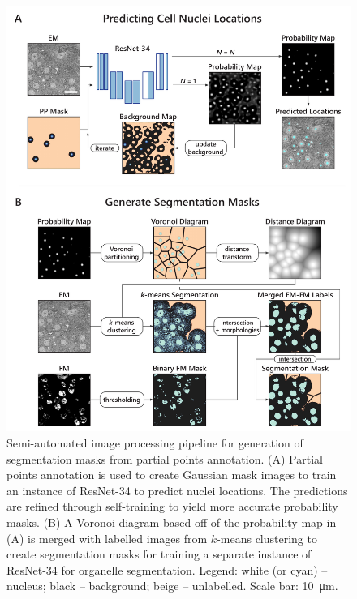 \begin{figure}[!tb]
    \centering
    \includegraphics[width=0.90\linewidth]{chapter-4/figures_PDF/fig4-M5_segmentation.pdf}
    \caption{Semi-automated image processing pipeline for generation of segmentation masks from partial points annotation.
    (A) Partial points annotation is used to create Gaussian mask images to train an instance of ResNet-34 to predict nuclei locations. The predictions are refined through self-training to yield more accurate probability masks.
    (B) A Voronoi diagram based off of the probability map in (A) is merged with labelled images from $k$-means clustering to create segmentation masks for training a separate instance of ResNet-34 for organelle segmentation.
    Legend: white (or cyan) -- nucleus; black -- background; beige -- unlabelled.
    Scale bar: \SI{10}{\micro\meter}.}
    \label{fig:5M_segmentation}
\end{figure}

